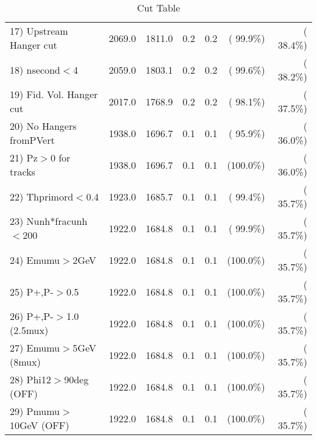 \begin{table}[h!]
\begin{tabular}{||l||r|r|r|r|r|r||}
 17) Upstream Hanger cut  &       2069.0 &       1811.0 &          0.2 &          0.2 & ( 99.9\%) & ( 38.4\%) \\
 18) nsecond$<$4          &       2059.0 &       1803.1 &          0.2 &          0.2 & ( 99.6\%) & ( 38.2\%) \\
 19) Fid. Vol. Hanger cut &       2017.0 &       1768.9 &          0.2 &          0.2 & ( 98.1\%) & ( 37.5\%) \\
 20) No Hangers fromPVert &       1938.0 &       1696.7 &          0.1 &          0.1 & ( 95.9\%) & ( 36.0\%) \\
 21) Pz$>$0 for tracks    &       1938.0 &       1696.7 &          0.1 &          0.1 & (100.0\%) & ( 36.0\%) \\
 22) Thprimord$<$0.4      &       1923.0 &       1685.7 &          0.1 &          0.1 & ( 99.4\%) & ( 35.7\%) \\
 23) Nunh*fracunh$<$200   &       1922.0 &       1684.8 &          0.1 &          0.1 & ( 99.9\%) & ( 35.7\%) \\
 24) Emumu$>$2GeV         &       1922.0 &       1684.8 &          0.1 &          0.1 & (100.0\%) & ( 35.7\%) \\
 25) P+,P-$>$0.5          &       1922.0 &       1684.8 &          0.1 &          0.1 & (100.0\%) & ( 35.7\%) \\
 26) P+,P-$>$1.0 (2.5mux) &       1922.0 &       1684.8 &          0.1 &          0.1 & (100.0\%) & ( 35.7\%) \\
 27) Emumu$>$5GeV  (8mux) &       1922.0 &       1684.8 &          0.1 &          0.1 & (100.0\%) & ( 35.7\%) \\
 28) Phi12$>$90deg  (OFF) &       1922.0 &       1684.8 &          0.1 &          0.1 & (100.0\%) & ( 35.7\%) \\
 29) Pmumu$>$10GeV  (OFF) &       1922.0 &       1684.8 &          0.1 &          0.1 & (100.0\%) & ( 35.7\%) \\
 \hline
 \hline
 \end{tabular}
 \caption{Cut Table           }
 \label{tab-cutcohjpsi-mumu_jpsi}
 \end{table}
